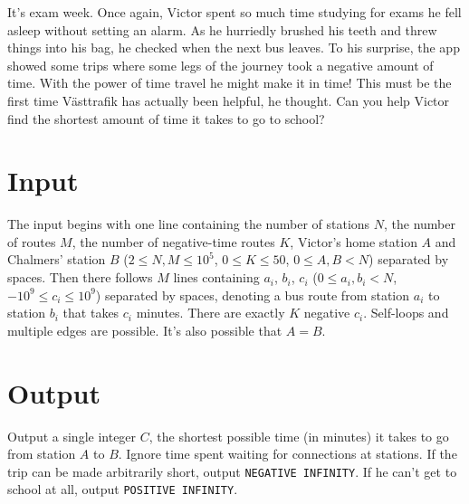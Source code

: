 
It's exam week. Once again, Victor spent so much time studying for exams he fell asleep without
setting an alarm. As he hurriedly brushed his teeth and threw things into his bag, he checked when
the next bus leaves. To his surprise, the app showed some trips where some legs of the journey took
a negative amount of time. With the power of time travel he might make it in time! This must be the
first time Västtrafik has actually been helpful, he thought. Can you help Victor find the shortest
amount of time it takes to go to school?

\section*{Input}

The input begins with one line containing the number of stations $N$, the number of routes $M$, the
number of negative-time routes $K$, Victor's home station $A$ and Chalmers' station $B$ ($2\le
N,M\le 10^5$, $0\le K\le 50$, $0\le A,B< N$) separated by spaces. Then there follows $M$ lines
containing $a_i$, $b_i$, $c_i$ ($0\le a_i,b_i<N$, $-10^9\le c_i\le 10^9$) separated by spaces,
denoting a bus route from station $a_i$ to station $b_i$ that takes $c_i$ minutes. There are
exactly $K$ negative $c_i$. Self-loops and multiple edges are possible. It's also possible that $A=B$.

\section*{Output}

Output a single integer $C$, the shortest possible time (in minutes) it takes to go from station $A$
to $B$. Ignore time spent waiting for connections at stations. If the trip can be made arbitrarily
short, output \texttt{NEGATIVE INFINITY}. If he can't get to school at all, output \texttt{POSITIVE INFINITY}.
